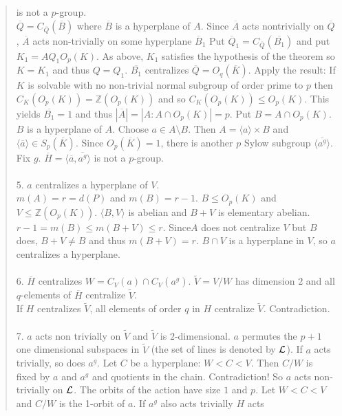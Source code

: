 \begin{quote}
is not a $p$-group.\\
${\overline Q} =C_{\overline Q}({\overline B})$  where ${\overline B}$ is a hyperplane of $A$.
Since ${\overline A}$ acts nontrivially on ${\overline Q}$, ${\overline A}$ acts non-trivially on some hyperplane ${\overline B_1}$
Put ${\overline Q_1} = C_{\overline Q}({\overline {B_1}})$ and put $K_1= A Q_1 O_p(K)$.  As above, $K_1$ satisfies the hypothesis of the theorem
so $K = K_1$ and thus $Q= Q_1$.  ${\overline {B_1}}$ centralizes ${\overline Q} = O_q({\overline K})$. Apply the result: If $K$ is solvable
with no non-trivial normal subgroup of order prime to $p$ then $C_K(O_p(K)) = {\mathbb Z}(O_p(K))$ and so $C_K(O_p(K)) \leq O_p(K)$.  This
yields ${\overline {B_1}} = 1$ and thus $|{\overline A}| = |A:A \cap O_p(K)|= p$. Put $B = A \cap O_p(K)$.  $B$  is a hyperplane of $A$.
Choose $a \in A \setminus B$.  Then $A = \langle a \rangle \times B$ and
$\langle {\overline a} \rangle \in S_p({\overline K})$.
Since $O_p({\overline K})=1$, there is another $p$ Sylow subgroup $\langle {\overline {a^g}} \rangle$. Fix $g$.
${\overline H} = \langle {\overline a}, {\overline {a^g}} \rangle$ is not a $p$-group.
\\
\\
5. $a$ centralizes a hyperplane of $V$.\\
$m(A)=r=d(P)$ and $m(B)=r-1$.  $B \leq O_p(K)$ and $V \leq {\mathbb Z}(O_p(K))$.  $\langle B, V \rangle$ is abelian and
$B+V$ is elementary abelian.  $r-1 = m(B) \leq m(B+V) \leq r$.  Since$A$ does not centralize $V$ but $B$ does, $B+V \ne B$ and thus
$m(B+V)=r$.  $B \cap V$ is a hyperplane in $V$, so $a$ centralizes a hyperplane.
\\
\\
6. ${\overline H}$ centralizes $W = C_V(a) \cap C_V(a^g)$.  ${\tilde V} = V /W$ has dimension $2$ and all $q$-elements of
${\overline H}$ centralize ${\tilde V}$.\\
If $H$ centralizes ${\tilde V}$, all elements of order $q$ in $H$ centralize ${\tilde V}$.  Contradiction.
\\
\\
7. $a$ acts non trivially on ${\tilde V}$ and ${\tilde V}$ is $2$-dimensional. 
$a$ permutes the $p+1$ one dimensional subspaces in ${\tilde V}$ (the set of lines is denoted by ${\cal L}$).
If $a$  acts trivially, so does $a^g$.  Let $C$ be a hyperplane: $W < C < V$.  Then $C/W$ is fixed by $a$ and $a^g$
and quotients in the chain.  Contradiction!  So $a$ acts non-trivially on ${\cal L}$.  The orbits of the action
have size $1$ and $p$.  Let $W < C < V$ and $C/W$ is the 1-orbit of $a$.  If $a^g$ also acts trivially $H$ acts

\end{quote}
